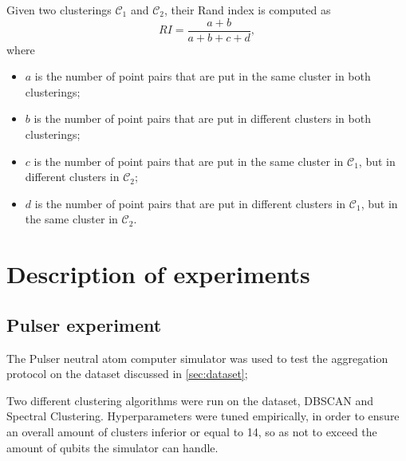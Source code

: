 Given two clusterings $\mathcal{C}_{1}$ and $\mathcal{C}_{2}$, their Rand index is computed as  
\begin{equation}
  \label{eqn:rand}
  RI = \frac{a + b}{a + b + c + d},
\end{equation}
where
\begin{itemize}
  \item $a$ is the number of point pairs that are put in the same cluster in both clusterings;
  \item $b$ is the number of point pairs that are put in different clusters in both clusterings; 
  \item $c$ is the number of point pairs that are put in the same cluster in $\mathcal{C}_{1}$, but in different clusters in $\mathcal{C}_{2}$;
  \item $d$ is the number of point pairs that are put in different clusters in $\mathcal{C}_{1}$, but in the same cluster in $\mathcal{C}_{2}$.
\end{itemize}

\section{Description of experiments}

\subsection{Pulser experiment}
The Pulser neutral atom computer simulator was used to test the aggregation protocol on the dataset discussed in \ref{sec:dataset}; 

Two different clustering algorithms were run on the dataset, DBSCAN and Spectral Clustering. Hyperparameters were tuned empirically, in order to ensure an overall amount of clusters inferior or equal to 14, so as not to exceed the amount of qubits the simulator can handle. %

\begin{figure}
  \centering 
  
\end{figure}